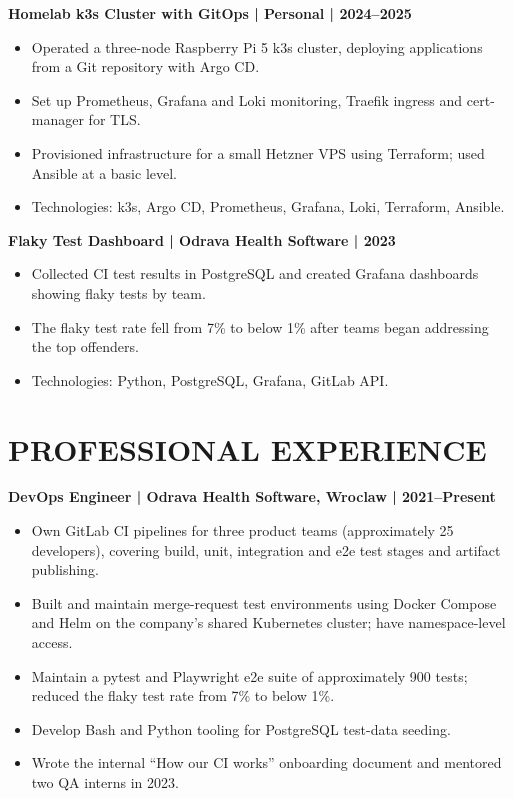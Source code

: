 \documentclass[11pt,a4paper]{article}
\begin{document}
\textbf{Homelab k3s Cluster with GitOps | Personal | 2024–2025}
\begin{itemize}
\item Operated a three-node Raspberry Pi 5 k3s cluster, deploying applications from a Git repository with Argo CD.
\item Set up Prometheus, Grafana and Loki monitoring, Traefik ingress and cert-manager for TLS.
\item Provisioned infrastructure for a small Hetzner VPS using Terraform; used Ansible at a basic level.
\item Technologies: k3s, Argo CD, Prometheus, Grafana, Loki, Terraform, Ansible.
\end{itemize}

\textbf{Flaky Test Dashboard | Odrava Health Software | 2023}
\begin{itemize}
\item Collected CI test results in PostgreSQL and created Grafana dashboards showing flaky tests by team.
\item The flaky test rate fell from 7\% to below 1\% after teams began addressing the top offenders.
\item Technologies: Python, PostgreSQL, Grafana, GitLab API.
\end{itemize}

\section*{PROFESSIONAL EXPERIENCE}
\textbf{DevOps Engineer | Odrava Health Software, Wroclaw | 2021–Present}
\begin{itemize}
\item Own GitLab CI pipelines for three product teams (approximately 25 developers), covering build, unit, integration and e2e test stages and artifact publishing.
\item Built and maintain merge-request test environments using Docker Compose and Helm on the company’s shared Kubernetes cluster; have namespace-level access.
\item Maintain a pytest and Playwright e2e suite of approximately 900 tests; reduced the flaky test rate from 7\% to below 1\%.
\item Develop Bash and Python tooling for PostgreSQL test-data seeding.
\item Wrote the internal “How our CI works” onboarding document and mentored two QA interns in 2023.
\end{itemize}
\end{document}
